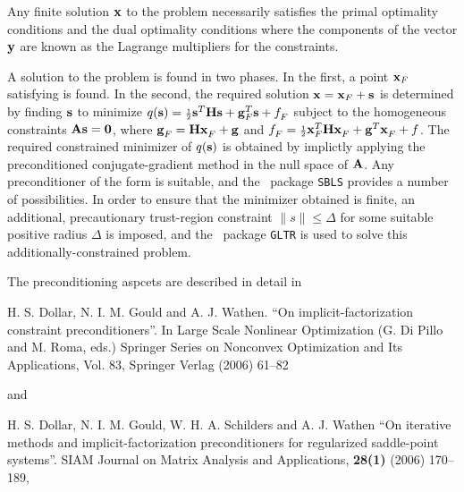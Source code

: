 \documentclass{galahad}
\begin{document}

\galmethod
Any finite solution ${\mathbf{x}}$ to the problem necessarily satisfies 
the primal optimality conditions
and the dual optimality conditions
where the components of the vector ${\mathbf{y}}$ are 
known as the Lagrange multipliers for the constraints.

A solution to the problem is found in two phases.
In the first, a point ${\mathbf{x}}_F$ satisfying  is found.
In the second, the required solution ${\mathbf{x}} = {\mathbf{x}}_F + {\mathbf{s}}$
is determined by finding ${\mathbf{s}}$ to minimize 
$q({\mathbf{s}}) = {\scriptstyle \frac{1}{2}} {\mathbf{s}}^T {\mathbf{H}} {\mathbf{s}} + {\mathbf{g}}_F^T {\mathbf{s}} + f_F^{}$
subject to the homogeneous constraints ${\mathbf{A}} {\mathbf{s}} = {\mathbf{0}}$,
where ${\mathbf{g}}_F^{} = {\mathbf{H}} {\mathbf{x}}_F^{} + {\mathbf{g}}$ and 
$f_F^{} = {\scriptstyle \frac{1}{2}} {\mathbf{x}}_F^T {\mathbf{H}} {\mathbf{x}}_F^{} + {\mathbf{g}}^T {\mathbf{x}}_F^{} + f$.
The required constrained minimizer of $q({\mathbf{s}})$ is obtained
by implictly applying the preconditioned conjugate-gradient method
in the null space of ${\mathbf{A}}$. Any preconditioner of the form
is suitable, and the \galahad\ package {\tt SBLS}
provides a number of possibilities. In order to ensure that the
minimizer obtained is finite, an additional, precautionary trust-region
constraint $\|s\| \leq \Delta$ for some suitable positive radius 
$\Delta$ is imposed, and the \galahad\ package {\tt GLTR} is used to solve 
this additionally-constrained problem.
\vspace*{1mm}

\galreferences
\vspace*{1mm}

\noindent
The preconditioning aspcets are described in detail in
\vspace*{1mm}

\noindent
H. S. Dollar, N. I. M. Gould and A. J. Wathen.
``On implicit-factorization constraint preconditioners''.
In  Large Scale Nonlinear Optimization (G. Di Pillo and M. Roma, eds.)
Springer Series on Nonconvex Optimization and Its Applications, Vol. 83,
Springer Verlag (2006) 61--82

\noindent
and

\noindent
H. S. Dollar, N. I. M. Gould, W. H. A. Schilders and A. J. Wathen
``On iterative methods and implicit-factorization preconditioners for 
regularized saddle-point systems''.
SIAM Journal on Matrix Analysis and Applications, {\bf 28(1)} (2006) 170--189,
\end{document}
